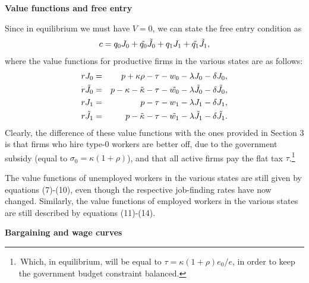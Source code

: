 \documentclass[12pt]{article} %
\theoremstyle{definition}
\begin{document}
\medskip 

\noindent \textbf{Value functions and free entry}

\medskip 

\noindent Since in equilibrium we must have $V=0$, we can state the free entry condition as 
\begin{equation}
c= q_0 J_0 + \Tilde{q_0}\Tilde{J_0} + q_1 J_1 + \Tilde{q_1}\Tilde{J_1}, \label{eq free entry intervention 4} 
\end{equation}where the value functions for productive firms in the various states are as follows: \begin{eqnarray}rJ_0 &=&p+\kappa \rho- \tau  -w_0-\lambda J_0 - \delta J_0, \nonumber \\
	r\Tilde{J_0} &=&p-\kappa-\Tilde{\kappa}- \tau -\Tilde{w_0}-\lambda \Tilde{J_0} - \delta \Tilde{J_0},\nonumber \\
	rJ_1 &=&p- \tau -w_1-\lambda J_1 - \delta J_1, \nonumber \\
	r\Tilde{J_1} &=&p-\Tilde{\kappa}-\tau-\Tilde{w_1}-\lambda \Tilde{J_1} - \delta \Tilde{J_1}.\nonumber 
\end{eqnarray}Clearly, the difference of these value functions with the ones provided in Section 3
is that firms who hire type-0 workers are better off, due to the government subsidy (equal to $\sigma_0=\kappa (1+\rho)$), and that all active firms pay the flat tax $\tau$.\footnote{\,Which, in equilibrium, will be equal to $\tau = \kappa(1+\rho)e_0/e$, in order to keep the government budget constraint balanced.} 

The value functions of unemployed workers in the various states are still given by equations (7)-(10),
even though the respective job-finding rates have now changed. Similarly, the value functions of employed workers in the various states are still described by equations (11)-(14). 

\medskip 

\noindent \textbf{Bargaining and wage curves}

\medskip 
\end{document}
